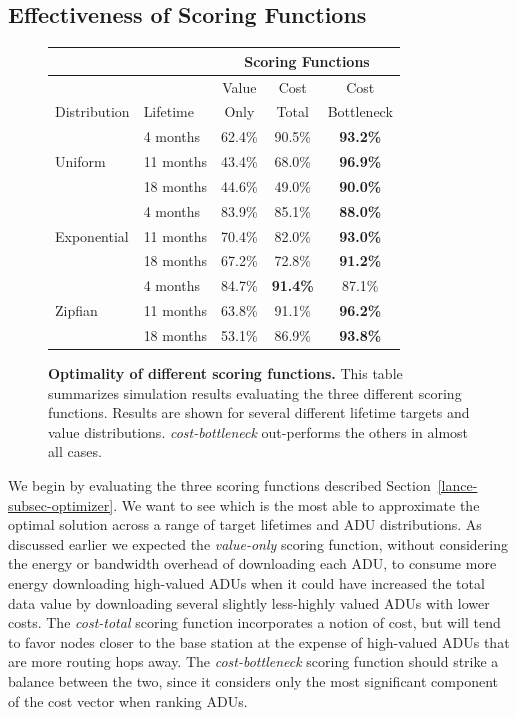 \subsection{Effectiveness of Scoring Functions}
\label{lance-sec-eval-heuristics}

\begin{figure}[t]
\begin{center}
\begin{tabular}{|l|l|ccc|}
\hline
& & \multicolumn{3}{|c|}{Scoring Functions} \\ \hline
& & Value & Cost & Cost \\
Distribution & Lifetime & Only & Total & Bottleneck \\ \hline
\multirow{3}{*}{Uniform} & 4 months & 62.4\% & 90.5\% & \textbf{93.2\%} \\
& 11 months & 43.4\% & 68.0\% & \textbf{96.9\%} \\
& 18 months & 44.6\% & 49.0\% & \textbf{90.0\%} \\ \hline
\multirow{3}{*}{Exponential} & 4 months & 83.9\% & 85.1\% & \textbf{88.0\%}
\\
& 11 months & 70.4\% & 82.0\% & \textbf{93.0\%} \\
& 18 months & 67.2\% & 72.8\% & \textbf{91.2\%} \\ \hline
\multirow{3}{*}{Zipfian} & 4 months & 84.7\% & \textbf{91.4\%} & 87.1\% \\
& 11 months & 63.8\% & 91.1\% & \textbf{96.2\%} \\
& 18 months & 53.1\% & 86.9\% & \textbf{93.8\%} \\ \hline
\end{tabular}
\end{center}

\caption{\textbf{Optimality of different scoring functions.} This table
summarizes simulation results evaluating the three different scoring
functions. Results are shown for several different lifetime targets and value
distributions. \textit{cost-bottleneck} out-performs the others in almost all
cases.}

\label{lance-sec-eval-table}
\end{figure}

We begin by evaluating the three scoring functions described
Section~\ref{lance-subsec-optimizer}. We want to see which is the most able
to approximate the optimal solution across a range of target lifetimes and
ADU distributions. As discussed earlier we expected the \textit{value-only}
scoring function, without considering the energy or bandwidth overhead of
downloading each ADU, to consume more energy downloading high-valued ADUs
when it could have increased the total data value by downloading several
slightly less-highly valued ADUs with lower costs. The \textit{cost-total}
scoring function incorporates a notion of cost, but will tend to favor nodes
closer to the base station at the expense of high-valued ADUs that are more
routing hops away. The \textit{cost-bottleneck} scoring function should
strike a balance between the two, since it considers only the most
significant component of the cost vector when ranking ADUs.

